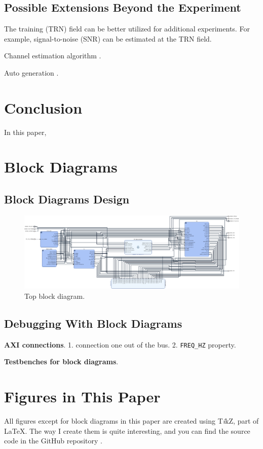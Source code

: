 \documentclass[journal,twoside]{IEEEtran}
\begin{document}
    \subsection{Possible Extensions Beyond the Experiment}

      The training (TRN) field can be better utilized for additional experiments.
      For example, signal-to-noise (SNR) can be estimated at the TRN field.

      Channel estimation algorithm \cite{zhao2023ompl,you2023beam}.

      Auto generation \cite{zhao2023automatic}.

  \section{Conclusion}

    In this paper,


  \appendices

  \section{Block Diagrams}

    \subsection{Block Diagrams Design}

      \begin{figure}
        \includegraphics[width=\linewidth]{../schematic/top.pdf}
        \caption{Top block diagram.}
      \end{figure}

    \subsection{Debugging With Block Diagrams}

      \textbf{AXI connections}.
      1. connection one out of the bus.
      2. \texttt{FREQ\_HZ} property.

      \textbf{Testbenches for block diagrams}.


  \section{Figures in This Paper}

    All figures except for block diagrams in this paper
    are created using T\textit{i}kZ, part of \LaTeX{}.
    The way I create them is quite interesting,
    and you can find the source code in the GitHub repository \cite{github_repo}.

  
  
\end{document}
